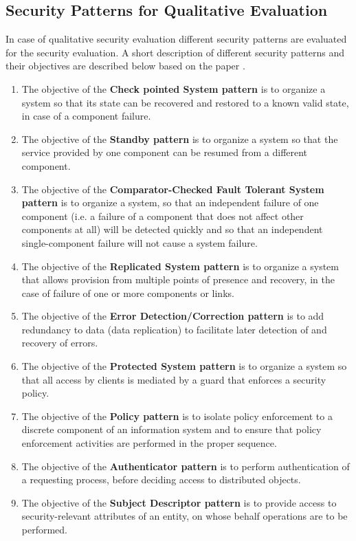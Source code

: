 \documentclass[pdftex,english,oribibl]{llncs}
\begin{document}
\subsection{Security Patterns for Qualitative Evaluation}
In case of qualitative security evaluation different security patterns are evaluated for the security evaluation.  A short description of different security patterns and their objectives are described below based on the paper \cite{HALKIDIS2006379}.
\begin{enumerate}[(1)]
	\item{The objective of the \textbf{Check pointed System pattern} is to organize a system so that its state can be recovered and restored to a known valid state, in case of a component failure.}
	\item{The objective of the \textbf{Standby pattern} is to organize a system so that the service provided by one component can be resumed from a different component.}
	\item{The objective of the \textbf{Comparator-Checked Fault Tolerant System pattern} is to organize a system, so that an independent failure of one component (i.e. a failure of a component that does not affect other components at all) will be detected quickly and so that an independent single-component failure will not cause a system failure.}
	\item {The objective of the \textbf{Replicated System pattern} is to organize a system that allows provision from multiple points of presence and recovery, in the case of failure of one or more components or links.}
	\item {The objective of the \textbf{Error Detection/Correction pattern} is to add redundancy to data (data replication) to facilitate later detection of and recovery of errors.}
	\item {The objective of the\textbf{ Protected System pattern} is to organize a system so that all access by clients is mediated by a guard that enforces a security policy.}
	\item{The objective of the \textbf{Policy pattern} is to isolate policy enforcement to a discrete component of an information system and to ensure that policy enforcement activities are performed in the proper sequence.}
	\item{The objective of the \textbf{Authenticator pattern} is to perform authentication of a requesting process, before deciding access to distributed objects.}
	\item{The objective of the \textbf{Subject Descriptor pattern} is to provide access to security-relevant attributes of an entity, on whose behalf operations are to be performed.}

\end{enumerate}
\end{document}
